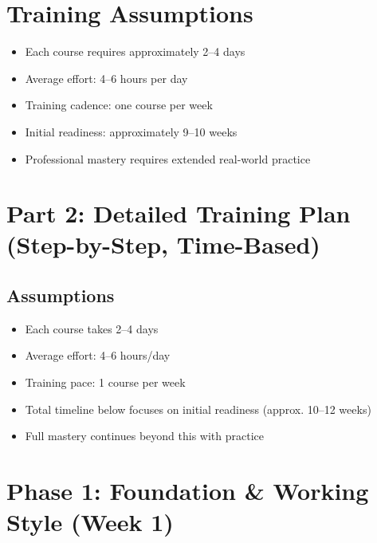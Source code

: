 \documentclass[12pt]{article}
\begin{document}
	\newpage
	
	\section*{Training Assumptions}
	
	\begin{itemize}
		\item Each course requires approximately 2--4 days
		\item Average effort: 4--6 hours per day
		\item Training cadence: one course per week
		\item Initial readiness: approximately 9--10 weeks
		\item Professional mastery requires extended real-world practice
	\end{itemize}
	
	\newpage
	
	
	\newpage
	
	\section*{Part 2: Detailed Training Plan (Step-by-Step, Time-Based)}
	
	\subsection*{Assumptions}
	\begin{itemize}
		\item Each course takes 2–4 days
		\item Average effort: 4–6 hours/day
		\item Training pace: 1 course per week
		\item Total timeline below focuses on initial readiness (approx. 10–12 weeks)
		\item Full mastery continues beyond this with practice
	\end{itemize}
	
	\vspace{0.5cm}
	
	\section*{ Phase 1: Foundation \& Working Style (Week 1)}
	
\end{document}
